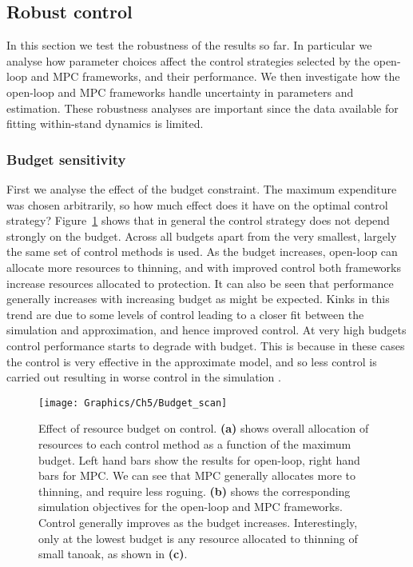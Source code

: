 \subsection{Robust control}

In this section we test the robustness of the results so far. In particular we analyse how parameter choices affect the control strategies selected by the open-loop and MPC frameworks, and their performance. We then investigate how the open-loop and MPC frameworks handle uncertainty in parameters and  estimation. These robustness analyses are important since the data available for fitting within-stand dynamics is limited.

\subsubsection{Budget sensitivity}

First we analyse the effect of the budget constraint. The maximum expenditure was chosen arbitrarily, so how much effect does it have on the optimal control strategy? Figure~\ref{fig:ch5:budget_scan} shows that in general the control strategy does not depend strongly on the budget. Across all budgets apart from the very smallest, largely the same set of control methods is used. As the budget increases, open-loop can allocate more resources to thinning, and with improved control both frameworks increase resources allocated to protection. It can also be seen that performance generally increases with increasing budget as might be expected. Kinks in this trend are due to some levels of control leading to a closer fit between the simulation and approximation, and hence improved control. At very high budgets control performance starts to degrade with budget. This is because in these cases the control is very effective in the approximate model, and so less control is carried out resulting in worse control in the simulation .

\begin{figure}
    \begin{center}
        \texttt{[image: Graphics/Ch5/Budget\_scan]}
        \caption[Varying the control budget]{Effect of resource budget on control. \textbf{(a)} shows overall allocation of resources to each control method as a function of the maximum budget. Left hand bars show the results for open-loop, right hand bars for MPC\@. We can see that MPC generally allocates more to thinning, and require less roguing. \textbf{(b)} shows the corresponding simulation objectives for the open-loop and MPC frameworks. Control generally improves as the budget increases. Interestingly, only at the lowest budget is any resource allocated to thinning of small tanoak, as shown in \textbf{(c)}.\label{fig:ch5:budget_scan}}
    \end{center}
\end{figure}

